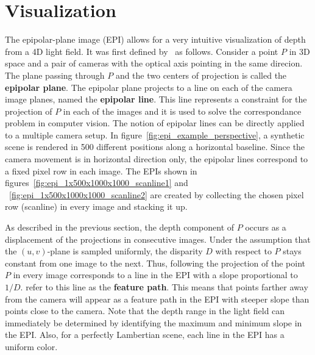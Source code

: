 \section{Visualization}
\label{sec:Visualization}
The epipolar-plane image (EPI) allows for a very intuitive visualization of depth from a 4D light field.
It was first defined by~\cite{EPI} as follows.
Consider a point $P$ in 3D space and a pair of cameras with the optical axis pointing in the same direcion.
The plane passing through $P$ and the two centers of projection is called the \textbf{epipolar plane}.
The epipolar plane projects to a line on each of the camera image planes, named the \textbf{epipolar line}.
This line represents a constraint for the projection of $P$ in each of the images and it is used to solve the correspondance problem in computer vision.
The notion of epipolar lines can be directly applied to a multiple camera setup.
In figure~\ref{fig:epi_example_perspective}, a synthetic scene is rendered in 500 different positions along a horizontal baseline.
Since the camera movement is in horizontal direction only, the epipolar lines correspond to a fixed pixel row in each image.
The EPIs shown in figures~\ref{fig:epi_1x500x1000x1000_scanline1} and ~\ref{fig:epi_1x500x1000x1000_scanline2} are created by collecting the chosen pixel row (scanline) in every image and stacking it up.

As described in the previous section, the depth component of $P$ occurs as a displacement of the projections in consecutive images.
Under the assumption that the $(u, v)$-plane is sampled uniformly, the disparity $D$ with respect to $P$ stays constant from one image to the next.
Thus, following the projection of the point $P$ in every image corresponds to a line in the EPI with a slope proportional to $1 / D$.
\cite{EPI} refer to this line as the \textbf{feature path}.
This means that points farther away from the camera will appear as a feature path in the EPI with steeper slope than points close to the camera.
Note that the depth range in the light field can immediately be determined by identifying the maximum and minimum slope in the EPI.
Also, for a perfectly Lambertian scene, each line in the EPI has a uniform color.

